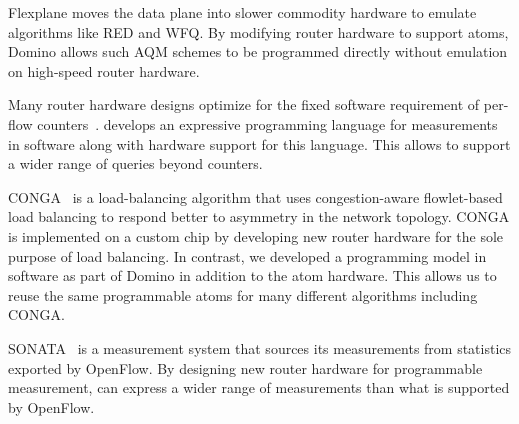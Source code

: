  Flexplane moves the data plane into slower commodity hardware
to emulate algorithms like RED and WFQ. By modifying router hardware to support
atoms,  Domino allows such AQM schemes to be programmed directly without
emulation on high-speed router hardware.

 Many router hardware designs optimize for
the fixed software requirement of per-flow counters~\cite{counter_shah}.
\TheSystem develops an expressive programming language for measurements in
software along with hardware support for this language. This allows \TheSystem
to support a wider range of queries beyond counters.

 CONGA~\cite{conga} is a load-balancing algorithm that uses
congestion-aware flowlet-based load balancing to respond better to asymmetry in
the network topology. CONGA is implemented on a custom chip by developing new
router hardware for the sole purpose of load balancing. In contrast, we
developed a programming model in software as part of Domino in addition to the
atom hardware. This allows us to reuse the same programmable atoms for many
different algorithms including CONGA.

 SONATA~\cite{streaming-monitoring} is a measurement system that
sources its measurements from statistics exported by OpenFlow. By designing new
router hardware for programmable measurement, \TheSystem can express a wider
range of measurements than what is supported by OpenFlow.
